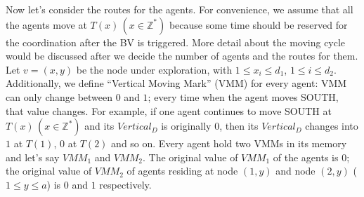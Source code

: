 Now let's consider the routes for the agents. For convenience, we assume that all the agents move at $T(x)\,(x\in\mathbb{Z}^*)$ because some time should be reserved for the coordination after the BV is triggered. More detail about the moving cycle would be discussed after we decide the number of agents and the routes for them. 
Let $v=(x, y)$ be the node under exploration, with $1\leq x_i \leq d_1$, $1\leq i \leq d_2$. Additionally, we define ``Vertical Moving Mark'' (VMM) for every agent: VMM can only change between $0$ and $1$; every time when the agent moves SOUTH, that value changes. For example, if one agent continues to move SOUTH at $T(x)\,(x\in\mathbb{Z}^*)$ and its $Vertical_D$ is originally $0$, then its $Vertical_D$ changes into $1$ at $T(1)$, $0$ at $T(2)$ and so on.
Every agent hold two VMMs in its memory and let's say $VMM_1$ and $VMM_2$. The original value of $VMM_1$ of the agents is $0$; the original value of $VMM_2$ of agents residing at node $(1, y)$ and node $(2, y)$ ($1\leq y\leq a$) is $0$ and $1$ respectively. 

